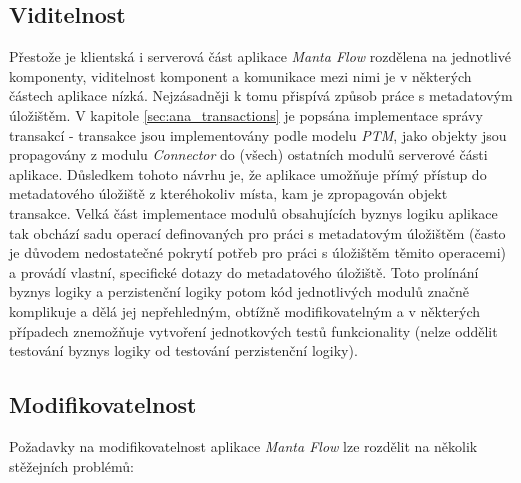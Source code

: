 \subsection{Viditelnost}
\label{sec:ana_visibility}
Přestože je klientská i serverová část aplikace \textit{Manta Flow} rozdělena na jednotlivé komponenty, viditelnost komponent a komunikace mezi nimi je v některých částech aplikace nízká. Nejzásadněji k tomu přispívá způsob práce s metadatovým úložištěm. V kapitole \ref{sec:ana_transactions} je popsána implementace správy transakcí - transakce jsou implementovány podle modelu \textit{PTM}, jako objekty jsou propagovány z modulu \textit{Connector} do (všech) ostatních modulů serverové části aplikace. Důsledkem tohoto návrhu je, že aplikace umožňuje přímý přístup do metadatového úložiště z kteréhokoliv místa, kam je zpropagován objekt transakce. Velká část implementace modulů obsahujících byznys logiku aplikace tak obchází sadu operací definovaných pro práci s metadatovým úložištěm (často je důvodem nedostatečné pokrytí potřeb pro práci s úložištěm těmito operacemi) a provádí vlastní, specifické dotazy do metadatového úložiště. Toto prolínání byznys logiky a perzistenční logiky potom kód jednotlivých modulů značně komplikuje a dělá jej nepřehledným, obtížně modifikovatelným a v některých případech znemožňuje vytvoření jednotkových testů funkcionality (nelze oddělit testování byznys logiky od testování perzistenční logiky).


\subsection{Modifikovatelnost}
\label{sec:ana_modularity}
Požadavky na modifikovatelnost aplikace \textit{Manta Flow} lze rozdělit na několik stěžejních problémů:

